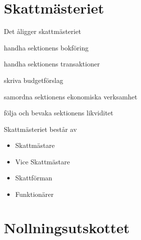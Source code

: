 \documentclass[pdfbookmarks,a4paper,11pt]{article}
\newlength{\itemcollength}
\newenvironment{reglemlista}{%
  \begin{list}{}{%
      \setlength{\labelwidth}{\itemcollength}%
      \setlength{\leftmargin}{\labelwidth + \labelsep}%
      \renewcommand{\makelabel}[1]{%
        \raisebox{0pt}[1ex][0pt]{%
          \makebox[\labelwidth][l]{%
            \parbox[t]{\itemcollength}{%
              \raggedright\hspace{0pt}##1}}}\hfill}%
      }}{%
  \end{list}}
\begin{document}
\section{Skattmästeriet}

\begin{reglemlista}

	\item[Åligganden]
	Det åligger skattmästeriet
	\begin{attlista}
		\item handha sektionens bokföring
		\item handha sektionens transaktioner
		\item skriva budgetförslag
		\item samordna sektionens ekonomiska verksamhet
		\item följa och bevaka sektionens likviditet
	\end{attlista}

	\item[Sammansättning]
	Skattmästeriet består av
	\begin{itemize}
		\item Skattmästare
		\item Vice Skattmästare
		\item Skattförman
		\item Funktionärer
	\end{itemize}
\end{reglemlista}

\section{Nollningsutskottet}
\end{document}
